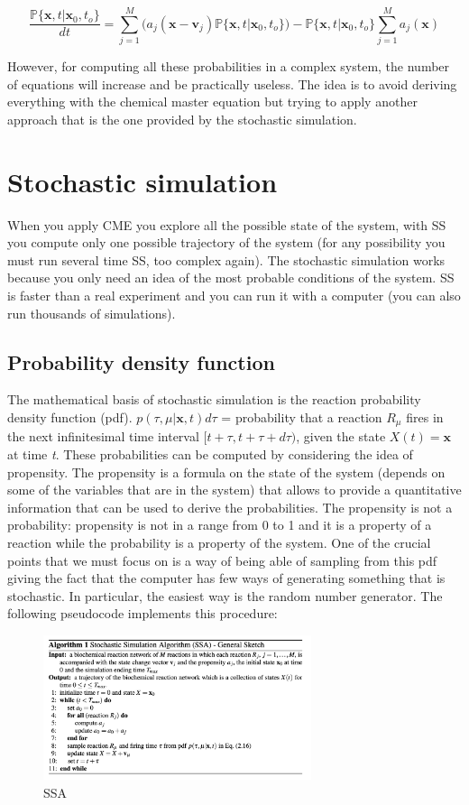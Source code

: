   $$\frac{\mathbb{P}\{\mathbf{x},t|\mathbf{x}_0,t_o\}}{dt}= \sum_{j=1}^{M}(a_j(\mathbf{x}-\mathbf{v}_j)\mathbb{P}\{\mathbf{x},t|\mathbf{x}_0,t_o\})- \mathbb{P}\{\mathbf{x},t|\mathbf{x}_0,t_o\}\sum^M_{j=1}a_j(\mathbf{x})$$

  However, for computing all these probabilities in a complex system, the number of equations will increase and be practically useless.
  The idea is to avoid deriving everything with the chemical master equation but trying to apply another approach that is the one provided by the stochastic simulation.

\section{Stochastic simulation}
When you apply CME you explore all the possible state of the system, with SS you compute only one possible trajectory of the system (for any possibility you must run several time SS, too complex again).
The stochastic simulation works because you only need an idea of the most probable conditions of the system.
SS is faster than a real experiment and you can run it with a computer (you can also run thousands of simulations).

  \subsection{Probability density function}
  The mathematical basis of stochastic simulation is the reaction probability density function (pdf).
  $p(\tau, \mu |\mathbf{x}, t)d\tau$ = probability that a reaction $R_\mu$ fires in the next infinitesimal time interval $[t+\tau,t+\tau+d\tau)$, given the state $X(t) = \mathbf{x}$ at time \emph{t}.
  These probabilities can be computed by considering the idea of propensity.
  The propensity is a formula on the state of the system (depends on some of the variables that are in the system) that allows to provide a quantitative information that can be used to derive the probabilities.
  The propensity is not a probability: propensity is not in a range from 0 to 1 and it is a property of a reaction while the probability is a property of the system.
  One of the crucial points that we must focus on is a way of being able of sampling from this pdf giving the fact that the computer has few ways of generating something that is stochastic.
  In particular, the easiest way is the random number generator.
  The following pseudocode implements this procedure:

  \begin{figure}
    \centering
    \includegraphics[width=0.7\textwidth]{SSA_algo.png}
    \caption{SSA}
  \end{figure}

